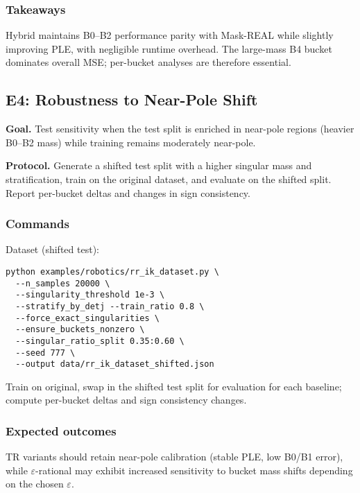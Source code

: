 \documentclass[11pt,twoside]{article}
\begin{document}
\subsubsection{Takeaways}

Hybrid maintains B0--B2 performance parity with Mask-REAL while slightly improving PLE, with negligible runtime overhead. The large-mass B4 bucket dominates overall MSE; per-bucket analyses are therefore essential.


\subsection{E4: Robustness to Near-Pole Shift}
\textbf{Goal.} Test sensitivity when the test split is enriched in near-pole regions (heavier B0--B2 mass) while training remains moderately near-pole.

\textbf{Protocol.} Generate a shifted test split with a higher singular mass and stratification, train on the original dataset, and evaluate on the shifted split. Report per-bucket deltas and changes in sign consistency.

\subsubsection{Commands}

Dataset (shifted test):
\begin{verbatim}
python examples/robotics/rr_ik_dataset.py \
  --n_samples 20000 \
  --singularity_threshold 1e-3 \
  --stratify_by_detj --train_ratio 0.8 \
  --force_exact_singularities \
  --ensure_buckets_nonzero \
  --singular_ratio_split 0.35:0.60 \
  --seed 777 \
  --output data/rr_ik_dataset_shifted.json
\end{verbatim}
Train on original, swap in the shifted test split for evaluation for each baseline; compute per-bucket deltas and sign consistency changes.

\subsubsection{Expected outcomes}

TR variants should retain near-pole calibration (stable PLE, low B0/B1 error), while $\varepsilon$-rational may exhibit increased sensitivity to bucket mass shifts depending on the chosen $\varepsilon$.

\end{document}
